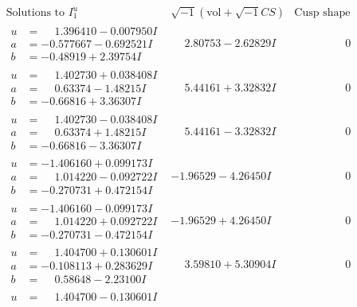 \documentclass[1p]{elsarticle_modified}
\theoremstyle{definition}
\newcommand{\I}{\sqrt{-1}}
\begin{document}
$$\begin{array}{c|c|c}
\text{Solutions to }I^u_{1}& \I (\text{vol} + \sqrt{-1}CS) & \text{Cusp shape}\\
 \hline 
\begin{aligned}
u &= \phantom{-}1.396410 - 0.007950 I \\
a &= -0.577667 - 0.692521 I \\
b &= -0.48919 + 2.39754 I\end{aligned}
 & \phantom{-}2.80753 - 2.62829 I & \phantom{-0.000000 } 0 \\ \hline\begin{aligned}
u &= \phantom{-}1.402730 + 0.038408 I \\
a &= \phantom{-}0.63374 - 1.48215 I \\
b &= -0.66816 + 3.36307 I\end{aligned}
 & \phantom{-}5.44161 + 3.32832 I & \phantom{-0.000000 } 0 \\ \hline\begin{aligned}
u &= \phantom{-}1.402730 - 0.038408 I \\
a &= \phantom{-}0.63374 + 1.48215 I \\
b &= -0.66816 - 3.36307 I\end{aligned}
 & \phantom{-}5.44161 - 3.32832 I & \phantom{-0.000000 } 0 \\ \hline\begin{aligned}
u &= -1.406160 + 0.099173 I \\
a &= \phantom{-}1.014220 - 0.092722 I \\
b &= -0.270731 + 0.472154 I\end{aligned}
 & -1.96529 - 4.26450 I & \phantom{-0.000000 } 0 \\ \hline\begin{aligned}
u &= -1.406160 - 0.099173 I \\
a &= \phantom{-}1.014220 + 0.092722 I \\
b &= -0.270731 - 0.472154 I\end{aligned}
 & -1.96529 + 4.26450 I & \phantom{-0.000000 } 0 \\ \hline\begin{aligned}
u &= \phantom{-}1.404700 + 0.130601 I \\
a &= -0.108113 + 0.283629 I \\
b &= \phantom{-}0.58648 - 2.23100 I\end{aligned}
 & \phantom{-}3.59810 + 5.30904 I & \phantom{-0.000000 } 0 \\ \hline\begin{aligned}
u &= \phantom{-}1.404700 - 0.130601 I \\

\end{aligned}
\end{array}$$
\end{document}
